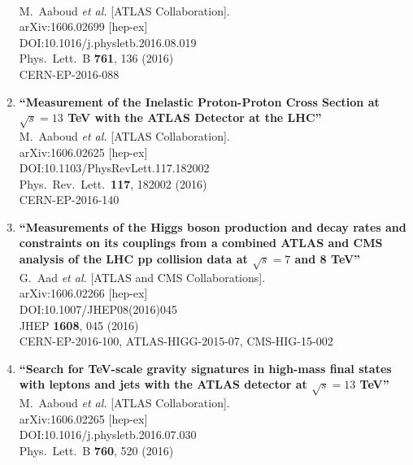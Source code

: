 \documentclass{article}
\begin{document}
\begin{enumerate}
  \\{}M.~Aaboud {\it et al.} [ATLAS Collaboration].
  \\{}arXiv:1606.02699 [hep-ex]
  \\{}DOI:10.1016/j.physletb.2016.08.019
  \\{}Phys.\ Lett.\ B {\bf 761}, 136 (2016)
  \\{}CERN-EP-2016-088
\item%
{\bf ``Measurement of the Inelastic Proton-Proton Cross Section at $\sqrt{s} = 13$ TeV with the ATLAS Detector at the LHC''}
  \\{}M.~Aaboud {\it et al.} [ATLAS Collaboration].
  \\{}arXiv:1606.02625 [hep-ex]
  \\{}DOI:10.1103/PhysRevLett.117.182002
  \\{}Phys.\ Rev.\ Lett.\  {\bf 117}, 182002 (2016)
  \\{}CERN-EP-2016-140
\item%
{\bf ``Measurements of the Higgs boson production and decay rates and constraints on its couplings from a combined ATLAS and CMS analysis of the LHC pp collision data at $ \sqrt{s}=7 $ and 8 TeV''}
  \\{}G.~Aad {\it et al.} [ATLAS and CMS Collaborations].
  \\{}arXiv:1606.02266 [hep-ex]
  \\{}DOI:10.1007/JHEP08(2016)045
  \\{}JHEP {\bf 1608}, 045 (2016)
  \\{}CERN-EP-2016-100, ATLAS-HIGG-2015-07, CMS-HIG-15-002
\item%
{\bf ``Search for TeV-scale gravity signatures in high-mass final states with leptons and jets with the ATLAS detector at $\sqrt{s}=13$ TeV''}
  \\{}M.~Aaboud {\it et al.} [ATLAS Collaboration].
  \\{}arXiv:1606.02265 [hep-ex]
  \\{}DOI:10.1016/j.physletb.2016.07.030
  \\{}Phys.\ Lett.\ B {\bf 760}, 520 (2016)

\end{enumerate}
\end{document}
